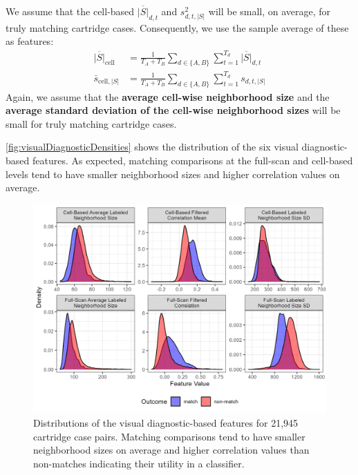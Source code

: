 \documentclass[
]{jdssv}
\begin{document}
We assume that the cell-based \(\overline{|S|}_{d,t}\) and
\(s^2_{d,t,|S|}\) will be small, on average, for truly matching
cartridge cases. Consequently, we use the sample average of these as
features: \begin{align*}
\overline{|S|}_{\text{cell}} &= \frac{1}{T_A + T_B} \sum_{d \in \{A,B\}} \sum_{t=1}^{T_d} \overline{|S|}_{d,t} \\
\bar{s}_{\text{cell},|S|} &= \frac{1}{T_A + T_B} \sum_{d \in \{A,B\}} \sum_{t=1}^{T_d} s_{d,t,|S|}
\end{align*} Again, we assume that the
\textbf{average cell-wise neighborhood size} and the
\textbf{average standard deviation of the cell-wise neighborhood sizes}
will be small for truly matching cartridge cases.

\autoref{fig:visualDiagnosticDensities} shows the distribution of the
six visual diagnostic-based features. As expected, matching comparisons
at the full-scan and cell-based levels tend to have smaller neighborhood
sizes and higher correlation values on average.

\begin{CodeChunk}
\begin{figure}[htbp]

{\centering \includegraphics[width=\textwidth]{images/visualDiagnosticDensities} 

}

\caption{\label{fig:visualDiagnosticDensities} Distributions of the visual diagnostic-based features for 21,945 cartridge case pairs. Matching comparisons tend to have smaller neighborhood sizes on average and higher correlation values than non-matches indicating their utility in a classifier.}\label{fig:unnamed-chunk-23}
\end{figure}
\end{CodeChunk}
\end{document}
